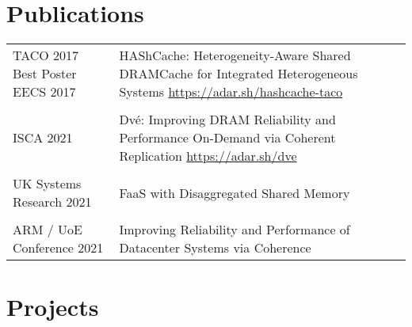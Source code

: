 \documentclass[a4paper,10pt]{article} %
\begin{document}
\section{Publications}
\begin{tabular}{p{3cm}p{11cm}}
TACO 2017 \newline \footnotesize{Best Poster EECS 2017} & HAShCache: Heterogeneity-Aware Shared DRAMCache for Integrated Heterogeneous Systems  \hfill
\href{https://adar.sh/hashcache-taco}{https://adar.sh/hashcache-taco}
\\
& \\
ISCA 2021 & Dv\'e: Improving DRAM Reliability and Performance On-Demand via \newline Coherent Replication \hfill  \href{https://adar.sh/dve}{https://adar.sh/dve}\\
&\\
UK Systems \newline Research 2021 & FaaS with Disaggregated Shared Memory \\
&\\
ARM / UoE Conference 2021 & Improving Reliability and Performance of Datacenter Systems via \newline Coherence \\
\end{tabular}

\section{Projects}
\end{document}
